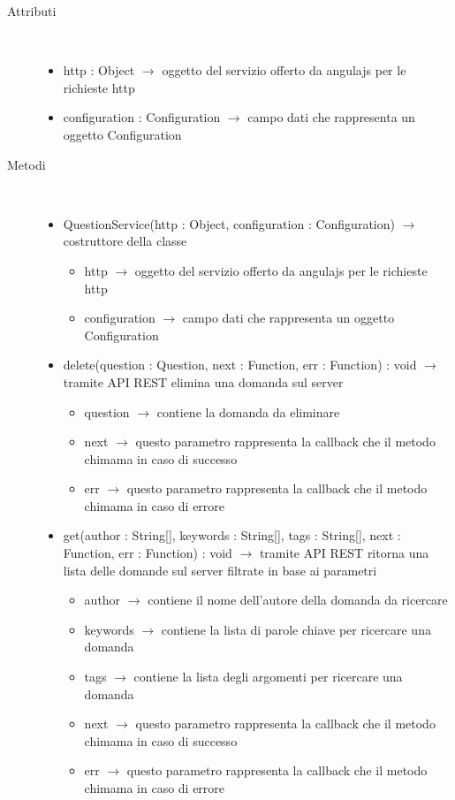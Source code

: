 \begin{description}
\item[Attributi] \hfill \\
\vspace{-7mm}
\begin{itemize}
	\item http : Object $\rightarrow$ oggetto del servizio offerto da angulajs per le richieste http
	\item configuration : Configuration $\rightarrow$ campo dati che rappresenta un oggetto Configuration
\end{itemize}

\item[Metodi] \hfill \\
\vspace{-7mm}
\begin{itemize}
	\item QuestionService(http : Object, configuration : Configuration) $\rightarrow$ costruttore della classe\begin{itemize}
		\item http $\rightarrow$ oggetto del servizio offerto da angulajs per le richieste http
		\item configuration $\rightarrow$ campo dati che rappresenta un oggetto Configuration
	\end{itemize}
	
	\item delete(question : Question, next : Function, err : Function) : void $\rightarrow$ tramite API REST elimina una domanda sul server\begin{itemize}
		\item question $\rightarrow$ contiene la domanda da eliminare
		\item next $\rightarrow$ questo parametro rappresenta la callback che il metodo chimama in caso di successo
		\item err $\rightarrow$ questo parametro rappresenta la callback che il metodo chimama in caso di errore
	\end{itemize}
	
	\item get(author : String[], keywords : String[], tags : String[], next : Function, err : Function) : void $\rightarrow$ tramite API REST ritorna una lista delle domande sul server filtrate in base ai parametri\begin{itemize}
		\item author $\rightarrow$ contiene il nome dell'autore della domanda da ricercare 
		\item keywords $\rightarrow$ contiene la lista di parole chiave per ricercare una domanda
		\item tags $\rightarrow$ contiene la lista degli argomenti per ricercare una domanda
		\item next $\rightarrow$ questo parametro rappresenta la callback che il metodo chimama in caso di successo
		\item err $\rightarrow$ questo parametro rappresenta la callback che il metodo chimama in caso di errore
	\end{itemize}
	

\end{itemize}
\end{description}
